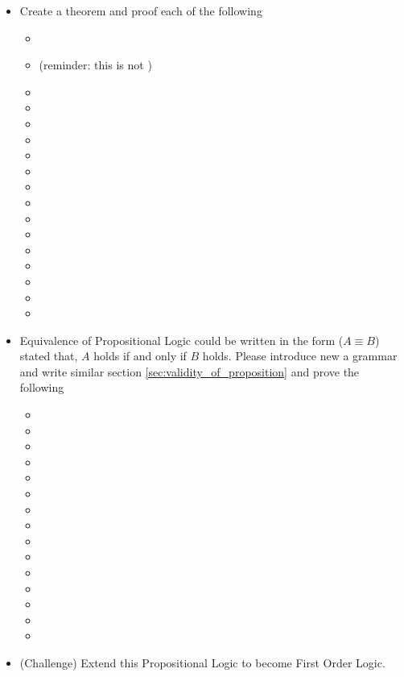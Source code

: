 \documentclass[master.tex]{subfiles}
\begin{document}
\begin{itemize}
\item Create a theorem and proof each of the following
  \begin{itemize}
  \item {}
  \item {} (reminder: this is  not )
  \item {}
  \item {}
  \item {}
  \item {}
  \item {}
  \item {}
  \item {}
  \item {}
  \item {}
  \item {}
  \item {}
  \item {}
  \item {}
  \item {}
  \item {}
  \end{itemize}

\newpage

\item Equivalence of Propositional Logic could be written in the form ($A \equiv
  B$) stated that, $A$ holds if and only if $B$ holds. Please
  introduce new a grammar  and write 
  similar section \ref{sec:validity_of_proposition} and prove the following
  \begin{itemize}
  \item {}
  \item {}
  \item {}
  \item {}
  \item {}
  \item {}
  \item {}
  \item {}
  \item {}
  \item {}
  \item {}
  \item {}
  \item {}
  \item {}
  \item {}
  \end{itemize}
\item (Challenge) Extend this Propositional Logic to become First Order Logic.
\end{itemize}
\end{document}
